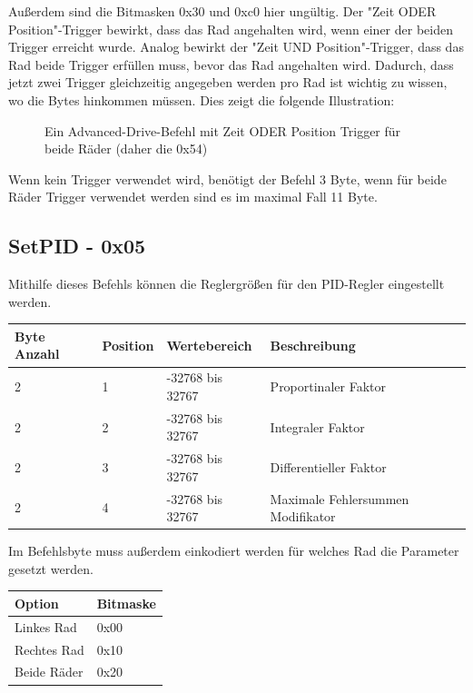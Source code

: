 \documentclass[a4paper]{article}
\begin{document}
	Außerdem sind die Bitmasken 0x30 und 0xc0 hier ungültig. Der "Zeit ODER Position"-Trigger bewirkt, dass das Rad angehalten
	wird, wenn einer der beiden Trigger erreicht wurde. Analog bewirkt der "Zeit UND Position"-Trigger, dass das Rad
	beide Trigger erfüllen muss, bevor das Rad angehalten wird. Dadurch, dass jetzt zwei Trigger gleichzeitig angegeben werden
	pro Rad ist wichtig zu wissen, wo die Bytes hinkommen müssen. Dies zeigt die folgende Illustration:
	\begin{figure}[!ht]
		\centering
		\caption{Ein Advanced-Drive-Befehl mit Zeit ODER Position Trigger für beide Räder (daher die 0x54)}
	\end{figure}
	Wenn kein Trigger verwendet wird, benötigt der Befehl 3 Byte, wenn für beide Räder Trigger verwendet werden sind es im
	maximal Fall 11 Byte.
	

	\subsection{SetPID - 0x05}

	Mithilfe dieses Befehls können die Reglergrößen für den PID-Regler eingestellt werden.

	\begin{tabularx}{\linewidth}{|l|l|l|X|}
		\hline
		\textbf{Byte Anzahl} & \textbf{Position} & \textbf{Wertebereich} & \textbf{Beschreibung} \\
		\hline
		\hline
		2					 & 1 & -32768 bis 32767 & Proportinaler Faktor\\
		\hline
		2					 & 2 & -32768 bis 32767 & Integraler Faktor\\
		\hline
		2					 & 3 & -32768 bis 32767 & Differentieller Faktor\\
		\hline
		2					 & 4 & -32768 bis 32767 & Maximale Fehlersummen Modifikator\\
		\hline
	\end{tabularx}

	Im Befehlsbyte muss außerdem einkodiert werden für welches Rad die Parameter gesetzt werden.

	\begin{tabularx}{\linewidth}{|l|X|}
		\hline
		\textbf{Option} & \textbf{Bitmaske} \\
		\hline
		\hline
		Linkes Rad	& 0x00 \\
		\hline
		Rechtes Rad	& 0x10 \\
		\hline
		Beide Räder & 0x20 \\
		\hline
	\end{tabularx}
\end{document}
